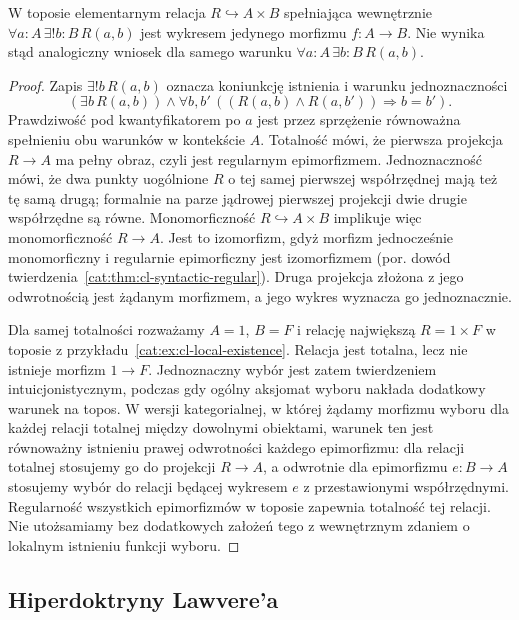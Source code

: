 \begin{stwierdzenie}\label{cat:prop:cl-unique-choice}
W toposie elementarnym relacja $R\hookrightarrow A\times B$ spełniająca wewnętrznie $\forall a:A\,\exists! b:B\,R(a,b)$ jest wykresem jedynego morfizmu $f:A\to B$. Nie wynika stąd analogiczny wniosek dla samego warunku $\forall a:A\,\exists b:B\,R(a,b)$.
\end{stwierdzenie}
\begin{proof}
Zapis $\exists! b\,R(a,b)$ oznacza koniunkcję istnienia i warunku jednoznaczności
\[
 (\exists b\,R(a,b))\wedge
 \forall b,b'\,((R(a,b)\wedge R(a,b'))\Rightarrow b=b').
\]
Prawdziwość pod kwantyfikatorem po $a$ jest przez sprzężenie równoważna spełnieniu obu warunków w kontekście $A$. Totalność mówi, że pierwsza projekcja $R\to A$ ma pełny obraz, czyli jest regularnym epimorfizmem. Jednoznaczność mówi, że dwa punkty uogólnione $R$ o tej samej pierwszej współrzędnej mają też tę samą drugą; formalnie na parze jądrowej pierwszej projekcji dwie drugie współrzędne są równe. Monomorficzność $R\hookrightarrow A\times B$ implikuje więc monomorficzność $R\to A$. Jest to izomorfizm, gdyż morfizm jednocześnie monomorficzny i regularnie epimorficzny jest izomorfizmem (por. dowód twierdzenia~\ref{cat:thm:cl-syntactic-regular}). Druga projekcja złożona z jego odwrotnością jest żądanym morfizmem, a jego wykres wyznacza go jednoznacznie.

Dla samej totalności rozważamy $A=1$, $B=F$ i relację największą $R=1\times F$ w toposie z przykładu~\ref{cat:ex:cl-local-existence}. Relacja jest totalna, lecz nie istnieje morfizm $1\to F$. Jednoznaczny wybór jest zatem twierdzeniem intuicjonistycznym, podczas gdy ogólny aksjomat wyboru nakłada dodatkowy warunek na topos. W wersji kategorialnej, w której żądamy morfizmu wyboru dla każdej relacji totalnej między dowolnymi obiektami, warunek ten jest równoważny istnieniu prawej odwrotności każdego epimorfizmu: dla relacji totalnej stosujemy go do projekcji $R\to A$, a odwrotnie dla epimorfizmu $e:B\to A$ stosujemy wybór do relacji będącej wykresem $e$ z przestawionymi współrzędnymi. Regularność wszystkich epimorfizmów w toposie zapewnia totalność tej relacji. Nie utożsamiamy bez dodatkowych założeń tego z wewnętrznym zdaniem o lokalnym istnieniu funkcji wyboru.
\end{proof}

\subsection{Hiperdoktryny Lawvere'a}

